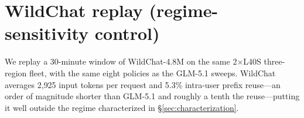 \documentclass{article}
\begin{document}
\newpage





\appendix

\section{WildChat replay (regime-sensitivity control)}
\label{app:wildchat}

We replay a 30-minute window of WildChat-4.8M \citep{wildchat2024} on the
same 2$\times$L40S three-region fleet, with the same eight policies as the
GLM-5.1 sweeps. WildChat averages 2{,}925 input tokens per request and
5.3\% intra-user prefix reuse---an order of magnitude shorter than GLM-5.1
and roughly a tenth the reuse---putting it well outside the regime
characterized in \S\ref{sec:characterization}.
\end{document}
